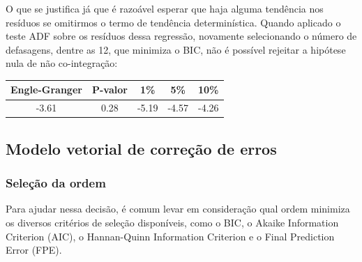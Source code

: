 \documentclass[a4paper,
               article,
               12pt,
               openany,
               oneside,
               english,
               brazil]{abntex2}
\numberwithin{equation}{section}
\begin{document}
    O que se justifica já que é razoável esperar que haja alguma tendência nos resíduos se omitirmos o termo de tendência determinística. Quando aplicado o teste ADF sobre os resíduos dessa regressão, novamente selecionando o número de defasagens, dentre as 12, que minimiza o BIC, não é possível rejeitar a hipótese nula de não co-integração:


    \begin{table}[ht]
        {%
            \begin{tabular}{ccccc}
                \midrule
                Engle-Granger & P-valor & 1\% & 5\% & 10\% \\
                \midrule
                -3.61 & 0.28 & -5.19 & -4.57 & -4.26 \\
                \midrule
            \end{tabular}
        } 
        {}
    \end{table}

    \subsection{Modelo vetorial de correção de erros}

    \subsubsection{Seleção da ordem}

    Para ajudar nessa decisão, é comum levar em consideração qual ordem minimiza os diversos critérios de seleção disponíveis, como o BIC, o Akaike Information Criterion (AIC), o Hannan-Quinn Information Criterion e o Final Prediction Error (FPE).
\end{document}
